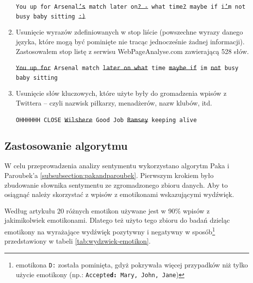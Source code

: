 \begin{enumerate}
  \texttt{You up for Arsenal\sout{'s} match later on\sout{? -} what
  time\sout{?} maybe if i\sout{'}m not busy baby sitting \sout{:)}} 
	
	\item Usunięcie wyrazów zdefiniowanych w stop liście (powszechne wyrazy danego
	języka, które mogą być pominięte nie tracąc jednocześnie żadnej informacji).
	Zastosowałem stop listę z serwisu \mbox{WebPageAnalyse.com} 
	\cite{WebPageAnalyse} zawierającą 528 słów.

	\texttt{\sout{You up for} Arsenal match \sout{later on what} time \sout{maybe if} 
 	im \sout{not} busy baby sitting}
	
	\item Usunięcie słów kluczowych, które użyte były do gromadzenia wpisów z
	Twittera -- czyli nazwisk piłkarzy, menadżerów, nazw klubów, itd.
	
	
	\texttt{OHHHHHH CLOSE \sout{Wilshere} Good Job \sout{Ramsey} keeping alive}
	
\end{enumerate}





\subsection{Zastosowanie algorytmu}
\label{subsection:sentyment-algorytm}

W celu przeprowadzenia analizy sentymentu wykorzystano algorytm Paka i
Paroubek'a \ref{subsubsection:pakandparoubek}. Pierwszym krokiem było zbudowanie
słownika sentymentu ze zgromadzonego zbioru danych. Aby to osiągnąć należy
skorzystać z wpisów z emotikonami wskazującymi wydźwięk. 

Według artykułu \cite{EmoticonAnalysisTwitter} 20 różnych emotikon używane
jest w 90\% wpisów z jakimikolwiek emotikonami.
Dlatego też użyto tego zbioru do badań dzieląc emotikony na
wyrażające wydźwięk pozytywny i negatywny w sposób\footnote{emotikona \texttt{D:} została pominięta, gdyż
pokrywała więcej przypadków niż tylko użycie emotikony (np.:
\texttt{Accepte\textbf{d:} Mary, John, Jane})} przedstawiony w tabeli
\ref{tab:wydzwiek-emotikon}.

